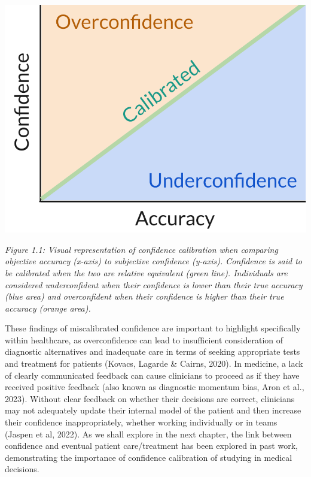 \documentclass[a4paper, nobind]{templates/ociamthesis}
\begin{document}
\begin{center}\includegraphics[width=1\linewidth]{./assets/confidenceCalibration} \end{center}

\emph{Figure 1.1: Visual representation of confidence calibration when comparing objective accuracy (x-axis) to subjective confidence (y-axis). Confidence is said to be calibrated when the two are relative equivalent (green line). Individuals are considered underconfident when their confidence is lower than their true accuracy (blue area) and overconfident when their confidence is higher than their true accuracy (orange area).}

\hfill\break
These findings of miscalibrated confidence are important to highlight specifically within healthcare, as overconfidence can lead to insufficient consideration of diagnostic alternatives and inadequate care in terms of seeking appropriate tests and treatment for patients (Kovacs, Lagarde \& Cairns, 2020). In medicine, a lack of clearly communicated feedback can cause clinicians to proceed as if they have received positive feedback (also known as diagnostic momentum bias, Aron et al., 2023). Without clear feedback on whether their decisions are correct, clinicians may not adequately update their internal model of the patient and then increase their confidence inappropriately, whether working individually or in teams (Jaspen et al, 2022). As we shall explore in the next chapter, the link between confidence and eventual patient care/treatment has been explored in past work, demonstrating the importance of confidence calibration of studying in medical decisions.
\end{document}
